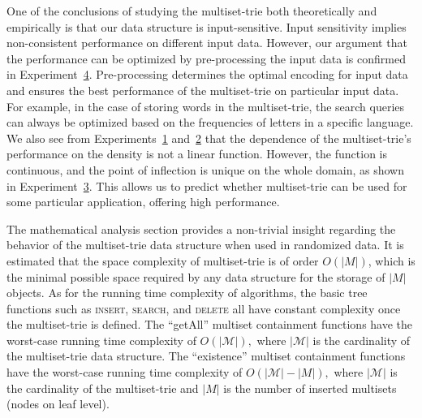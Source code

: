 \documentclass[algorithms,article,accept,pdftex,moreauthors]{Definitions/mdpi}
\begin{document}
%
One of the conclusions of studying the multiset-trie both theoretically and empirically is that our data structure is input-sensitive. Input sensitivity implies non-consistent performance on different input data. However, our argument that the performance can be optimized by pre-processing the input data is confirmed in  Experiment~\hyperref[ss:exp3]{4}. Pre-processing determines the optimal encoding for input data and ensures the best performance of the multiset-trie on particular input data. For example, in the case of storing words in the multiset-trie, the search queries can always be optimized based on the frequencies of letters in a specific language. We also see from Experiments~\hyperref[s:exp1]{1} and~\hyperref[s:exp2]{2} that the dependence of the multiset-trie's performance on the density is not a linear function. However, the function is continuous, and the point of inflection is unique on the whole domain, as shown in Experiment~\hyperref[s:exp3]{3}. This allows us to predict whether multiset-trie can be used for some particular application, offering high performance. 

%
The mathematical analysis section provides a non-trivial insight regarding the behavior of the multiset-trie data structure when used in randomized data. It is estimated that the space complexity of multiset-trie is of order $O(|M|)$, which is the minimal possible space required by any data structure for the storage of $|M|$ objects. 
As for the running time complexity of algorithms, the basic tree functions such as \textsc{insert}, \textsc{search}, and \textsc{delete} all have constant complexity once the multiset-trie is defined. The ``getAll'' multiset containment functions have the worst-case running time complexity of $O(|\mathcal{M}|),$ where $|\mathcal{M}|$ is the cardinality of the multiset-trie data structure. The ``existence'' multiset containment functions have the worst-case running time complexity of $O(|\mathcal{M}| - |M|),$ where $|\mathcal{M}|$ is the cardinality of the multiset-trie and $|M|$ is the number of inserted multisets (nodes on leaf level). 

\end{document}
